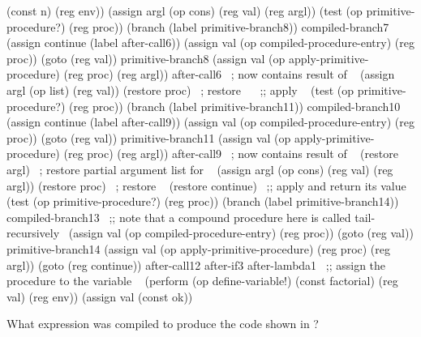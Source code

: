 \begin{exerciseGroup}
\begin{codeFigure}
\begin{compactCodeBlock}
          (const n)
          (reg env))
  (assign argl (op cons) (reg val) (reg argl))
  (test (op primitive-procedure?) (reg proc))
  (branch (label primitive-branch8))
compiled-branch7
  (assign continue (label after-call6))
  (assign val (op compiled-procedure-entry) (reg proc))
  (goto (reg val))
primitive-branch8
  (assign val
          (op apply-primitive-procedure)
          (reg proc)
          (reg argl))
after-call6   ~\textrm{;  now contains result of }~
  (assign argl (op list) (reg val))
  (restore proc) ~\textrm{; restore }~
~\textrm{;; apply }~
  (test (op primitive-procedure?) (reg proc))
  (branch (label primitive-branch11))
compiled-branch10
  (assign continue (label after-call9))
  (assign val (op compiled-procedure-entry) (reg proc))
  (goto (reg val))
primitive-branch11
  (assign val
          (op apply-primitive-procedure)
          (reg proc)
          (reg argl))
after-call9      ~\textrm{;  now contains result of }~
  (restore argl) ~\textrm{; restore partial argument list for \code{*}}~
  (assign argl (op cons) (reg val) (reg argl))
  (restore proc) ~\textrm{; restore \code{*}}~
  (restore continue)
~\textrm{;; apply \code{*} and return its value}~
  (test (op primitive-procedure?) (reg proc))
  (branch (label primitive-branch14))
compiled-branch13
~\textrm{;; note that a compound procedure here is called tail-recursively}~
  (assign val (op compiled-procedure-entry) (reg proc))
  (goto (reg val))
primitive-branch14
  (assign val
          (op apply-primitive-procedure)
          (reg proc)
          (reg argl))
  (goto (reg continue))
after-call12
after-if3
after-lambda1
~\textrm{;; assign the procedure to the variable }~
  (perform (op define-variable!)
           (const factorial)
           (reg val)
           (reg env))
  (assign val (const ok))
\end{compactCodeBlock}
\end{codeFigure}

\label{Exercise 5.35}
 What expression was compiled to
produce the code shown in ?


\end{exerciseGroup}
